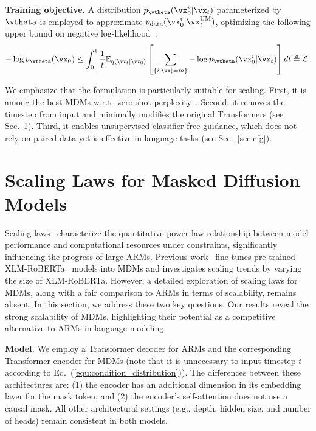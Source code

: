 \documentclass{article} %
\begin{document}
\textbf{Training objective.} A distribution $p_{\vtheta}(\vx_0^i|\vx_t)$ parameterized by $\vtheta$ is employed to approximate $p_{\text{data}}(\vx_0^i|\vx_t^{\text{UM}})$, optimizing the following upper bound on negative log-likelihood~\citep{ou2024your}:
\begin{align}
\label{equ:loss}
    - \log p_{\vtheta}(\vx_0) \leq \int_0^1 \frac{1}{t} \mathbb{E}_{q(\vx_t|\vx_0)}\left[ \sum_{\{i| \vx_t^i = m\}} - \log p_{\vtheta}(\vx_0^i|\vx_t) \right] d t \triangleq \mathcal{L}.
\end{align} 

We emphasize that the formulation is particularly suitable for scaling. First, it is among the best MDMs w.r.t.\ zero-shot perplexity~\citep{ou2024your}. Second,
it removes the timestep from input and minimally modifies the original Transformers (see Sec.~\ref{sec:scale_law}). Third, it enables unsupervised classifier-free guidance, which does not rely on paired data yet is effective in language tasks (see Sec.~\ref{sec:cfg}).


\section{Scaling Laws for Masked Diffusion Models}
\label{sec:scale_law}

Scaling laws~\citep{kaplan2020scaling, hoffmann2022training} characterize the quantitative power-law relationship between model performance and computational resources under constraints, significantly influencing the progress of large ARMs. Previous work~\cite{ye2023diffusion} fine-tunes pre-trained XLM-RoBERTa~\citep{goyal2021larger, conneau2019unsupervised} models into MDMs and investigates scaling trends by varying the size of XLM-RoBERTa. However, a detailed exploration of scaling laws for MDMs, along with a fair comparison to ARMs in terms of scalability, remains absent. In this section, we address these two key questions. Our results reveal the strong scalability of MDMs, highlighting their potential as a competitive alternative to ARMs in language modeling.

\textbf{Model.}  We employ a Transformer decoder for ARMs and the corresponding Transformer encoder for MDMs (note that it is unnecessary to input timestep $t$ according to Eq.~(\ref{equ:condition_distribution})). The differences between these architectures are: (1) the encoder has an additional dimension in its embedding layer for the mask token, and (2) the encoder's self-attention does not use a causal mask. All other architectural settings (e.g., depth, hidden size, and number of heads) remain consistent in both models.
\end{document}
